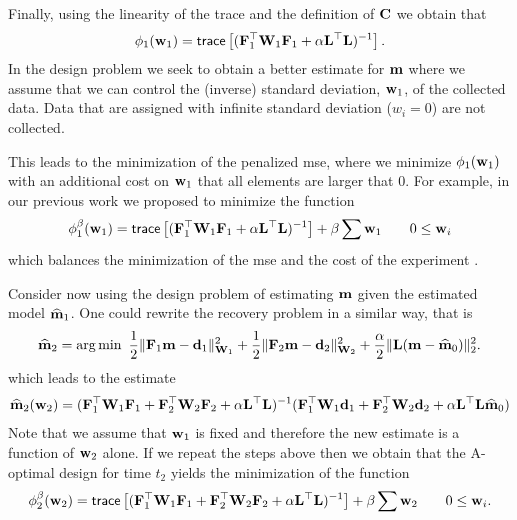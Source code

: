 \documentclass[11pt]{article}
\newcommand{\bfC}	{{\bf{C}}}
\newcommand{\bfF}	{{\bf{F}}}
\newcommand{\bfL}	{{\bf{L}}}
\newcommand{\bfW}	{{\bf{W}}}
\newcommand{\bfd}	{{\bf{d}}}
\newcommand{\bfm}	{{\bf{m}}}
\newcommand{\bfw}	{{\bf{w}}}
\newcommand{\hf}        {{\frac 12}}
\newcommand{\LtL}       { \bfL^{\top}\bfL}
\renewcommand{\hf}		 {\frac12}
\newcommand{\bfmhat}    {{\widehat{\bfm}}}
\begin{document}
Finally, using the linearity of the trace and the definition of $\bfC$ we obtain that
\begin{align}
\label{design1}
\phi_{1}(\bfw_1 ) =  {\sf trace} \left[   (\bfF_{1}^{\top}\bfW_{1}\bfF_{1}   + 
 {\alpha} \LtL)^{-1} \right]. 
\end{align}
In the design problem we seek to obtain a better estimate for $\bfm$ where we assume
that we can control the (inverse) standard deviation, $\bfw_{1}$, of the collected data.
Data that are assigned with infinite standard deviation ($w_i = 0$) are not collected.
 
 This leads to the minimization of the penalized mse, where 
we minimize $\phi_{1}(\bfw_{1})$ with an additional cost on $\bfw_{1}$ that all elements are larger that $0$.
 For example, in our
previous work we proposed to minimize the function
\begin{align}
\label{designp1}
\phi_{1}^{\beta}(\bfw_1 ) =  {\sf trace} \left[   (\bfF_{1}^{\top}\bfW_{1}\bfF_{1}   + 
 {\alpha} \LtL)^{-1} \right]  + \beta \sum \bfw_{1} \quad \quad 0 \le \bfw_i 
\end{align}
which balances the minimization of the mse and the cost of the experiment \cite{Haber2008}.


\bigskip

Consider now using the design problem of estimating $\bfm$ given the estimated model $\widehat \bfm_{1}$.
One could rewrite the recovery problem in a similar way,
that is
\begin{align}
\label{mest2}
\bfmhat_{2} = {\rm arg}\min\ \hf \| \bfF_{1} \bfm - \bfd_{1}\|^{2}_{\bfW_{1}} + \hf \| \bfF_{2} \bfm - \bfd_{2}\|^{2}_{\bfW_{2}}  + {\frac {\alpha} 2}
\|\bfL (\bfm -\bfmhat_{0}) \|^{2}_2. 
\end{align}
which leads to the estimate
\begin{align}
\label{mest2}
\bfmhat_{2}(\bfw_{2}) = (\bfF_{1}^{\top} \bfW_{1}\bfF_{1} +
\bfF_{2}^{\top} \bfW_{2}\bfF_{2} + \alpha \LtL)^{-1} (\bfF_{1}^{\top} \bfW_{1} \bfd_{1} +\bfF_{2}^{\top} \bfW_{2} \bfd_{2}
+ \alpha \LtL \bfmhat_{0})
\end{align}
Note that we assume that $\bfw_{1}$ is fixed and therefore the new estimate is a function of $\bfw_{2}$ alone.
If we repeat the steps above then we obtain that the A-optimal design for time $t_{2}$ yields the minimization of
the function
\begin{align}
\label{design2na}
\phi_{2}^{\beta}(\bfw_{2} ) =  {\sf trace} \left[   (\bfF_{1}^{\top}\bfW_{1}\bfF_{1}   + \bfF_{2}^{\top}\bfW_{2}\bfF_{2} +
\alpha \LtL)^{-1} \right] + \beta \sum \bfw_{2}\quad \quad 0 \le \bfw_i . 
\end{align}
\end{document}
